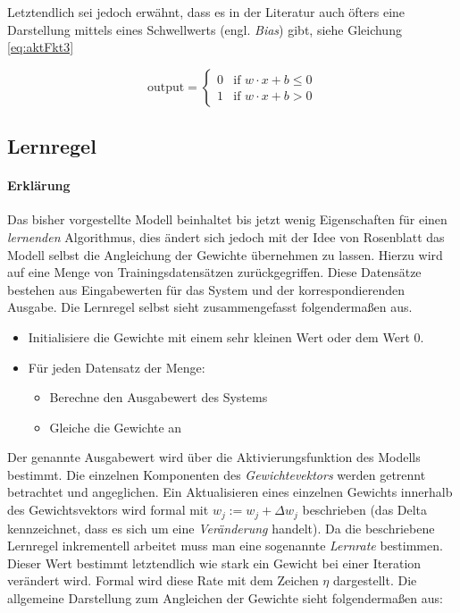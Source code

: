 Letztendlich sei jedoch erwähnt, dass es in der Literatur auch öfters eine Darstellung mittels eines Schwellwerts (engl. \emph{Bias}) gibt, siehe Gleichung \autoref{eq:aktFkt3} \cite{dlnielsen}

\begin{equation} \label{eq:aktFkt3}
\mbox{output} =\begin{cases}
	0 & \mbox{if } w\cdot x + b \leq 0 \\
    1 & \mbox{if } w\cdot x + b > 0
  \end{cases}
\end{equation}



\subsection{Lernregel} \label{ss:lernregel}

\paragraph{Erklärung}

Das bisher vorgestellte Modell beinhaltet bis jetzt wenig Eigenschaften für einen \emph{lernenden} Algorithmus, dies ändert sich jedoch mit der Idee von Rosenblatt das Modell selbst die Angleichung der Gewichte übernehmen zu lassen. Hierzu wird auf eine Menge von Trainingsdatensätzen zurückgegriffen.
Diese Datensätze bestehen aus Eingabewerten für das System und der korrespondierenden Ausgabe. Die Lernregel selbst sieht zusammengefasst folgendermaßen aus.

\vspace{4mm}
\begin{minipage}{\textwidth}
\begin{itemize}
\item Initialisiere die Gewichte mit einem sehr kleinen Wert oder dem Wert 0.
\item Für jeden Datensatz der Menge:
\begin{itemize}
	\item Berechne den Ausgabewert des Systems
	\item Gleiche die Gewichte an
\end{itemize}
\end{itemize}
\end{minipage}

\vspace{5 mm}

\label{sp:lernrate}
Der genannte Ausgabewert wird über die Aktivierungsfunktion des Modells bestimmt. Die einzelnen Komponenten des \emph{Gewichtevektors} werden getrennt betrachtet und angeglichen. Ein Aktualisieren eines einzelnen Gewichts innerhalb des Gewichtsvektors wird formal mit $w_j := w_j + \Delta w_j$ beschrieben (das Delta kennzeichnet, dass es sich um eine \emph{Veränderung} handelt). Da die beschriebene Lernregel inkrementell arbeitet muss man eine sogenannte \emph{Lernrate} bestimmen. Dieser Wert bestimmt letztendlich wie stark ein Gewicht bei einer Iteration verändert wird. Formal wird diese Rate mit dem Zeichen $\eta$ dargestellt. Die allgemeine Darstellung zum Angleichen der Gewichte sieht folgendermaßen aus:

